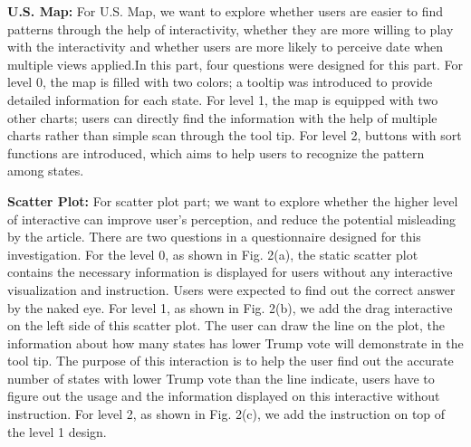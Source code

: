 \documentclass[9pt,journal,compsoc]{IEEEtran}
\begin{document}
\textbf{U.S. Map:} For U.S. Map, we want to explore whether users are easier to find patterns through the help of interactivity, whether they are more willing to play with the interactivity and whether users are more likely to perceive date when multiple views applied.In this part, four questions were designed for this part. For level 0, the map is filled with two colors; a tooltip was introduced to provide detailed information for each state. For level 1, the map is equipped with two other charts; users can directly find the information with the help of multiple charts rather than simple scan through the tool tip. For level 2, buttons with sort functions are introduced, which aims to help users to recognize the pattern among states.

\textbf{Scatter Plot:} For scatter plot part; we want to explore whether the higher level of interactive can improve user's perception, and reduce the potential misleading by the article. There are two questions in a questionnaire designed for this investigation. For the level 0, as shown in Fig. 2(a), the static scatter plot contains the necessary information is displayed for users without any interactive visualization and instruction. Users were expected to find out the correct answer by the naked eye. For level 1, as shown in Fig. 2(b), we add the drag interactive on the left side of this scatter plot. The user can draw the line on the plot, the information about how many states has lower Trump vote will demonstrate in the tool tip. The purpose of this interaction is to help the user find out the accurate number of states with lower Trump vote than the line indicate, users have to figure out the usage and the information displayed on this interactive without instruction.  For level 2, as shown in Fig. 2(c), we add the instruction on top of the level 1 design. 
\end{document}
